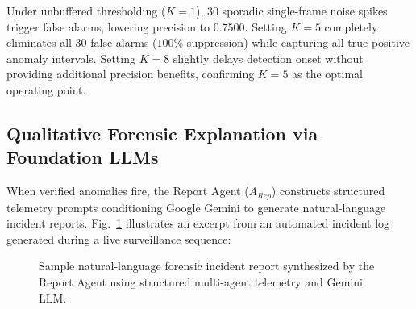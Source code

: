 \documentclass[conference]{IEEEtran}
\begin{document}
\begin{table}[htbp]
\caption{Ablation Study: Impact of Sustained Counter Persistence Window ($K$) on False Alarm Suppression}
\label{tab:ablation}
\centering
{}
\end{table}

Under unbuffered thresholding ($K=1$), 30 sporadic single-frame noise spikes trigger false alarms, lowering precision to $0.7500$. Setting $K=5$ completely eliminates all 30 false alarms ($100\%$ suppression) while capturing all true positive anomaly intervals. Setting $K=8$ slightly delays detection onset without providing additional precision benefits, confirming $K=5$ as the optimal operating point.

\subsection{Qualitative Forensic Explanation via Foundation LLMs}
When verified anomalies fire, the Report Agent ($A_{Rep}$) constructs structured telemetry prompts conditioning Google Gemini to generate natural-language incident reports. Fig.~\ref{fig:report} illustrates an excerpt from an automated incident log generated during a live surveillance sequence:

\begin{figure}[htbp]
\centering
{}
\caption{Sample natural-language forensic incident report synthesized by the Report Agent using structured multi-agent telemetry and Gemini LLM.}
\label{fig:report}
\end{figure}
\end{document}
